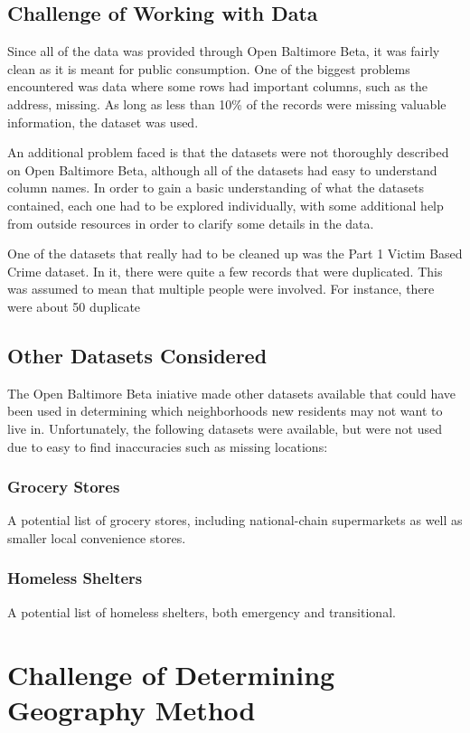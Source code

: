 \documentclass[conference]{IEEEtran}
\begin{document}
\subsection{Challenge of Working with Data}
Since all of the data was provided through Open Baltimore Beta, it was fairly clean as it is meant for public consumption.
One of the biggest problems encountered was data where some rows had important columns, such as the address, missing.
As long as less than 10\% of the records were missing valuable information, the dataset was used.

An additional problem faced is that the datasets were not thoroughly described on Open Baltimore Beta, although all of the
datasets had easy to understand column names. In order to gain a basic understanding of what the datasets contained, each
one had to be explored individually, with some additional help from outside resources in order to clarify some details in
the data.

One of the datasets that really had to be cleaned up was the Part 1 Victim Based Crime dataset.  In it, there were
 quite a few records that were duplicated. This was assumed to mean that multiple people were involved.  For instance, there
 were about 50 duplicate 

\subsection{Other Datasets Considered}
The Open Baltimore Beta iniative made other datasets available that could have been used in determining which neighborhoods
new residents may not want to live in.
Unfortunately, the following datasets were available, but were not used due to easy to find inaccuracies such as missing locations:

\subsubsection{Grocery Stores}
A potential list of grocery stores, including national-chain supermarkets as well as smaller local convenience stores.

\subsubsection{Homeless Shelters}
A potential list of homeless shelters, both emergency and transitional.

\section {Challenge of Determining Geography Method}
\end{document}
